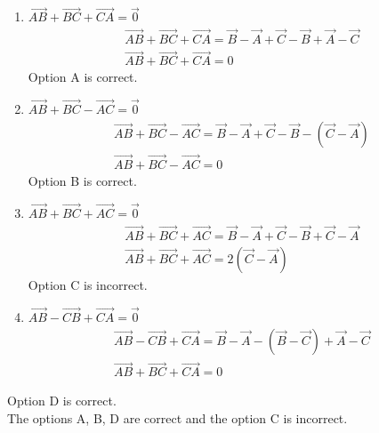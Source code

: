 \documentclass[journal,12pt,twocolumn]{IEEEtran}
\begin{document}
\begin{enumerate}
\begin{enumerate}
\item $\overrightarrow{AB}+\overrightarrow{BC}+\overrightarrow{CA} = \overrightarrow{0}$
\begin{align}
\overrightarrow{AB}+\overrightarrow{BC}+\overrightarrow{CA} =
\vec{B}-\vec{A} + \vec{C} - \vec{B} + \vec{A} - \vec{C}\\
\overrightarrow{AB}+\overrightarrow{BC}+\overrightarrow{CA} = 0
\end{align}
Option A is correct.\\

\item $\overrightarrow{AB}+\overrightarrow{BC}-\overrightarrow{AC} = \overrightarrow{0}$
\begin{align}
\overrightarrow{AB}+\overrightarrow{BC}-\overrightarrow{AC} =
\vec{B}-\vec{A} + \vec{C} - \vec{B} - (\vec{C} - \vec{A})\\
\overrightarrow{AB}+\overrightarrow{BC}-\overrightarrow{AC} = 0
\end{align}
Option B is correct.\\

\item $\overrightarrow{AB}+\overrightarrow{BC}+\overrightarrow{AC} = \overrightarrow{0}$
\begin{align}
\overrightarrow{AB}+\overrightarrow{BC}+\overrightarrow{AC} =
\vec{B}-\vec{A} + \vec{C} - \vec{B} + \vec{C} - \vec{A}\\
\overrightarrow{AB}+\overrightarrow{BC}+\overrightarrow{AC} = 2(\vec{C}-\vec{A})
\end{align}
Option C is incorrect.\\

\item $\overrightarrow{AB}-\overrightarrow{CB}+\overrightarrow{CA} = \overrightarrow{0}$
\begin{align}
\overrightarrow{AB}-\overrightarrow{CB}+\overrightarrow{CA} =
\vec{B}-\vec{A} - (\vec{B} - \vec{C}) + \vec{A} - \vec{C}\\
\overrightarrow{AB}+\overrightarrow{BC}+\overrightarrow{CA} = 0
\end{align}
\end{enumerate}
Option D is correct.\\

The options A, B, D are correct and the option C is incorrect.\\


\end{enumerate}
\end{document}

